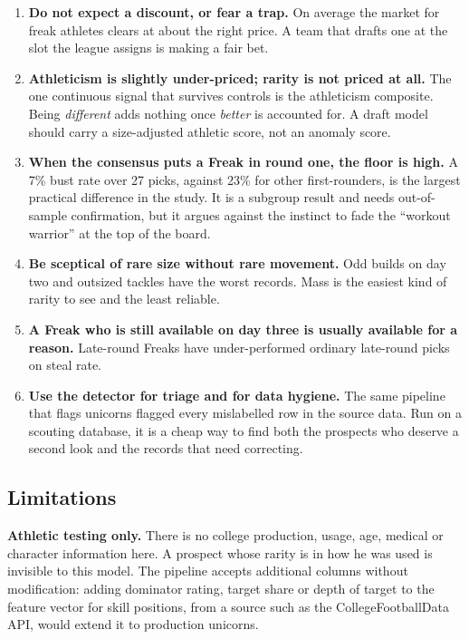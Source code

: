 \documentclass[11pt]{article}
\begin{document}
\begin{enumerate}[leftmargin=1.4em]
\item \textbf{Do not expect a discount, or fear a trap.} On average the market for freak athletes clears at about the right price. A team that drafts one at the slot the league assigns is making a fair bet.
\item \textbf{Athleticism is slightly under-priced; rarity is not priced at all.} The one continuous signal that survives controls is the athleticism composite. Being \emph{different} adds nothing once \emph{better} is accounted for. A draft model should carry a size-adjusted athletic score, not an anomaly score.
\item \textbf{When the consensus puts a Freak in round one, the floor is high.} A 7\% bust rate over 27 picks, against 23\% for other first-rounders, is the largest practical difference in the study. It is a subgroup result and needs out-of-sample confirmation, but it argues against the instinct to fade the ``workout warrior'' at the top of the board.
\item \textbf{Be sceptical of rare size without rare movement.} Odd builds on day two and outsized tackles have the worst records. Mass is the easiest kind of rarity to see and the least reliable.
\item \textbf{A Freak who is still available on day three is usually available for a reason.} Late-round Freaks have under-performed ordinary late-round picks on steal rate.
\item \textbf{Use the detector for triage and for data hygiene.} The same pipeline that flags unicorns flagged every mislabelled row in the source data. Run on a scouting database, it is a cheap way to find both the prospects who deserve a second look and the records that need correcting.
\end{enumerate}

\subsection{Limitations}\label{sec:limits}

\textbf{Athletic testing only.} There is no college production, usage, age, medical or character information here. A prospect whose rarity is in how he was used is invisible to this model. The pipeline accepts additional columns without modification: adding dominator rating, target share or depth of target to the feature vector for skill positions, from a source such as the CollegeFootballData API, would extend it to production unicorns.
\end{document}
